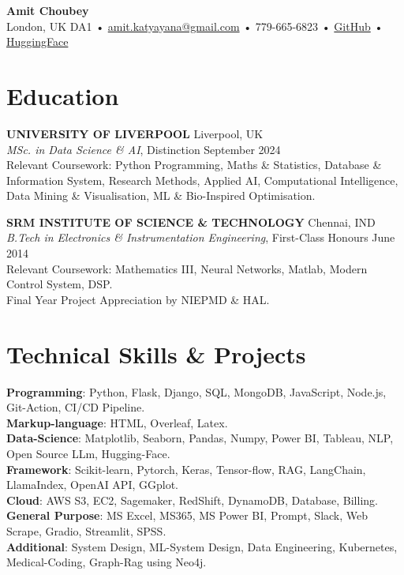 \documentclass[a4paper,9pt]{article} %
\begin{document}
\begin{center}
    {\LARGE \textbf{Amit Choubey}} \\
    London, UK  DA1 • \href{mailto:amit.katyayana@gmail.com}{amit.katyayana@gmail.com} • 779-665-6823 • \href{https://github.com/amit-chaubey}{GitHub} • \href{ https://huggingface.co/sweatSmile}{HuggingFace}
\end{center}

\vspace{0.1cm} %

\section*{Education}

\textbf{UNIVERSITY OF LIVERPOOL} \hfill Liverpool, UK \\
\textit{MSc. in Data Science \& AI}, Distinction \hfill September 2024 \\
Relevant Coursework: Python Programming, Maths \& Statistics, Database \& Information System, Research Methods, Applied AI, Computational Intelligence, Data Mining \& Visualisation, ML \& Bio-Inspired Optimisation.\\

\vspace{0.1cm} %

\textbf{SRM INSTITUTE OF SCIENCE \& TECHNOLOGY} \hfill Chennai, IND \\
\textit{B.Tech in Electronics \& Instrumentation Engineering}, First-Class Honours \hfill June 2014 \\
Relevant Coursework:  Mathematics III, Neural Networks, Matlab, Modern Control System, DSP. \\
Final Year Project Appreciation by NIEPMD \& HAL.

\section*{Technical Skills \& Projects}

\textbf{Programming}: Python, Flask, Django, SQL, MongoDB, JavaScript, Node.js, Git-Action, CI/CD Pipeline.\\
\textbf{Markup-language}: HTML, Overleaf, Latex.\\
\textbf{Data-Science}: Matplotlib, Seaborn, Pandas, Numpy, Power BI, Tableau, NLP, Open Source LLm, Hugging-Face.\\ 
\textbf{Framework}: Scikit-learn, Pytorch, Keras, Tensor-flow, RAG, LangChain, LlamaIndex, OpenAI API, GGplot.\\
\textbf{Cloud}: AWS S3, EC2, Sagemaker, RedShift, DynamoDB, Database, Billing.\\
\textbf{General Purpose}: MS Excel, MS365, MS Power BI, Prompt, Slack, Web Scrape, Gradio, Streamlit, SPSS.\\
\textbf{Additional}: System Design, ML-System Design, Data Engineering, Kubernetes, Medical-Coding, Graph-Rag using Neo4j.
\vspace{0.2cm}
\end{document}
